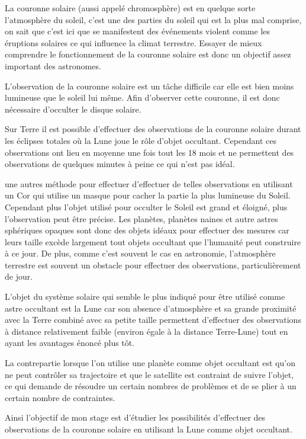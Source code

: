 \documentclass[12pt]{article} %
\begin{document}
		La couronne solaire (aussi appelé chromosphère) est en quelque sorte l'atmosphère du soleil, c'est une des parties du soleil qui est la plus mal comprise, on sait que c'est ici que se manifestent des événements violent comme les éruptions solaires ce qui influence la climat terrestre. Essayer de mieux comprendre le fonctionnement de la couronne solaire est donc un objectif assez important des astronomes.
		
		L'observation de la couronne solaire est un tâche difficile car elle est bien moins lumineuse que le soleil lui même. Afin d'observer cette couronne, il est donc nécessaire d'occulter le disque solaire.
		
		Sur Terre il est possible d'effectuer des observations de la couronne solaire durant les éclipses totales où la Lune joue le rôle d'objet occultant. Cependant ces observations ont lieu en moyenne une fois tout les 18 mois et ne permettent des observations de quelques minutes à peine ce qui n'est pas idéal.
		
		une autres méthode pour effectuer d'effectuer de telles observations en utilisant un \gls{Cor} qui utilise un masque pour cacher la partie la plus lumineuse du Soleil. Cependant plus l'objet utilisé pour occulter le Soleil est grand et éloigné, plus l'observation peut être précise. Les planètes, planètes naines et autre astres sphériques opaques sont donc des objets idéaux pour effectuer des mesures car leurs taille excède largement tout objets occultant que l'humanité peut construire à ce jour. De plus, comme c'est souvent le cas en astronomie, l'atmosphère terrestre est souvent un obstacle pour effectuer des observations, particulièrement de jour.
		
		L'objet du système solaire qui semble le plus indiqué pour être utilisé comme astre occultant est la Lune car son absence d'atmosphère et sa grande proximité avec la Terre combiné avec sa petite taille permettent d'effectuer des observations à distance relativement faible (environ égale à la distance Terre-Lune) tout en ayant les avantages énoncé plus tôt.
		 
		La contrepartie lorsque l'on utilise une planète comme objet occultant est qu'on ne peut contrôler sa trajectoire et que le satellite est contraint de suivre l'objet, ce qui demande de résoudre un certain nombres de problèmes et de se plier à un certain nombre de contraintes.
		
		Ainsi l'objectif de mon stage est d'étudier les possibilités d'effectuer des observations de la couronne solaire en utilisant la Lune comme objet occultant.
		 
\end{document}
